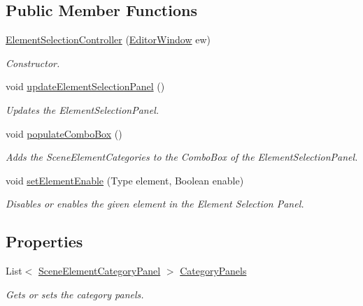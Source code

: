 \subsection*{Public Member Functions}
\begin{DoxyCompactItemize}
\item 
\hyperlink{class_a_rdev_kit_1_1_controller_1_1_editor_controller_1_1_element_selection_controller_af47cc4cd03ff1da41dd787719e70f4cd}{Element\-Selection\-Controller} (\hyperlink{class_a_rdev_kit_1_1_editor_window}{Editor\-Window} ew)
\begin{DoxyCompactList}\small\item\em Constructor. \end{DoxyCompactList}\item 
void \hyperlink{class_a_rdev_kit_1_1_controller_1_1_editor_controller_1_1_element_selection_controller_a8901ac3bab63f9b4f38f5ba2b86a86d8}{update\-Element\-Selection\-Panel} ()
\begin{DoxyCompactList}\small\item\em Updates the Element\-Selection\-Panel. \end{DoxyCompactList}\item 
void \hyperlink{class_a_rdev_kit_1_1_controller_1_1_editor_controller_1_1_element_selection_controller_a1bf985716c260e5c312d59a342c4fcb1}{populate\-Combo\-Box} ()
\begin{DoxyCompactList}\small\item\em Adds the Scene\-Element\-Categories to the Combo\-Box of the Element\-Selection\-Panel. \end{DoxyCompactList}\item 
void \hyperlink{class_a_rdev_kit_1_1_controller_1_1_editor_controller_1_1_element_selection_controller_a470d43f1c3fe742fcf7ff5f8f5675819}{set\-Element\-Enable} (Type element, Boolean enable)
\begin{DoxyCompactList}\small\item\em Disables or enables the given element in the Element Selection Panel. \end{DoxyCompactList}\end{DoxyCompactItemize}
\subsection*{Properties}
\begin{DoxyCompactItemize}
\item 
List$<$ \hyperlink{class_a_rdev_kit_1_1_view_1_1_scene_element_category_panel}{Scene\-Element\-Category\-Panel} $>$ \hyperlink{class_a_rdev_kit_1_1_controller_1_1_editor_controller_1_1_element_selection_controller_a23dae11ee466555e6be598481a3459f2}{Category\-Panels}
\begin{DoxyCompactList}\small\item\em Gets or sets the category panels. \end{DoxyCompactList}\end{DoxyCompactItemize}


